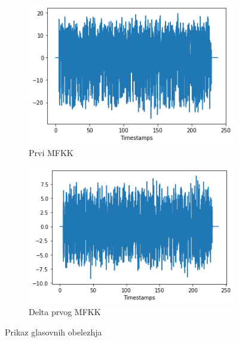 \documentclass[a4paper, openany, oneside, 11pt]{book}
\begin{document}
\begin{figure}[!h]
        \centering
        \begin{subfigure}{0.475\textwidth}
            \centering
            \includegraphics[scale=0.5]{res/cep1.png}
            \caption{Prvi MFKK}
            \label{fig:4a}
            \vspace{0pt}
        \end{subfigure}%
        \begin{subfigure}{0.475\textwidth}
            \centering
            \includegraphics[scale=0.5]{res/Dcep1.png}
            \caption{Delta prvog MFKK}
            \label{fig:4b}
            \vspace{0pt}
        \end{subfigure}
        \caption{Prikaz glasovnih obelezhja}
        \label{fig:4}
\end{figure}
\newpage
\end{document}
